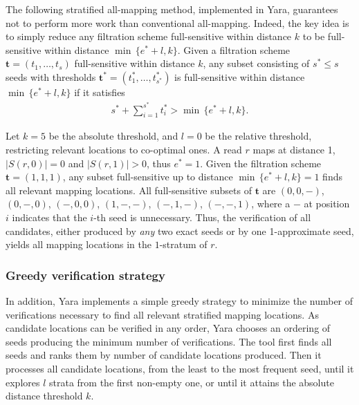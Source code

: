 The following stratified all-mapping method, implemented in Yara, guarantees not to perform more work than conventional all-mapping.
Indeed, the key idea is to simply reduce any filtration scheme full-sensitive within distance $k$ to be full-sensitive within distance $\min \,\{ e^*+l, k\}$.
Given a filtration scheme $\mathbf{t}=(t_1,\dots,t_s)$ full-sensitive within distance $k$, any subset consisting of $s^* \leq s$ seeds with thresholds $\mathbf{t^*}=(t^{*}_{1},\dots,t^{*}_{s^*})$ is full-sensitive within distance $\min \,\{ e^*+l, k\}$ if it satisfies
\begin{eqnarray}
s^* + \sum_{i=1}^{s^*} t_i^* > \min \,\{ e^*+l, k\}.
\end{eqnarray}

\begin{example}
Let $k=5$ be the absolute threshold, and $l=0$ be the relative threshold, restricting relevant locations to co-optimal ones.
A read $r$ maps at distance 1, \ie $|S(r,0)| = 0$ and $|S(r,1)| > 0$, thus $e^* = 1$.
Given the filtration scheme $\mathbf{t}=(1,1,1)$, any subset full-sensitive up to distance $\min \,\{ e^*+l, k\} = 1$ finds all relevant mapping locations.
All full-sensitive subsets of $\mathbf{t}$ are $(0,0,-)$, $(0,-,0)$, $(-,0,0)$, $(1,-,-)$, $(-,1,-)$, $(-,-,1)$, where a $-$ at position $i$ indicates that the $i$-th seed is unnecessary.
Thus, the verification of all candidates, either produced by \emph{any} two exact seeds or by one 1-approximate seed, yields all mapping locations in the $1$-stratum of $r$.
\end{example}

\subsubsection{Greedy verification strategy}

In addition, Yara implements a simple greedy strategy to minimize the number of verifications necessary to find all relevant stratified mapping locations.
As candidate locations can be verified in any order, Yara chooses an ordering of seeds producing the minimum number of verifications.
The tool first finds all seeds and ranks them by number of candidate locations produced.
Then it processes all candidate locations, from the least to the most frequent seed, until it explores $l$ strata from the first non-empty one, or until it attains the absolute distance threshold $k$.

